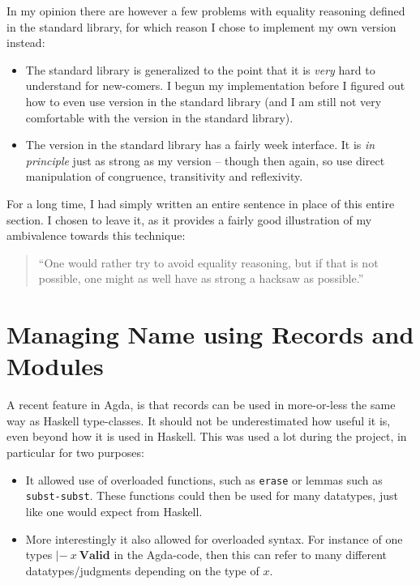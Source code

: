 In my opinion there are however a few problems with equality reasoning defined
in the standard library, for which reason I chose to implement my own version
instead:

\begin{itemize}
\item The standard library is generalized to the point that it is \emph{very}
  hard to understand for new-comers. I begun my implementation before I figured
  out how to even use version in the standard library (and I am still not very
  comfortable with the version in the standard library).
\item The version in the standard library has a fairly week interface. It is
  \emph{in principle} just as strong as my version -- though then again, so use
  direct manipulation of congruence, transitivity and reflexivity.
\end{itemize}

For a long time, I had simply written an entire sentence in place of this entire
section. I chosen to leave it, as it provides a fairly good illustration of my
ambivalence towards this technique:

\begin{quote}
``One would rather try to avoid equality reasoning, but if that is not possible,
one might as well have as strong a hacksaw as possible.''
\end{quote}

\section{Managing Name using Records and Modules}
A recent feature in Agda, is that records can be used in more-or-less the same
way as Haskell type-classes. It should not be underestimated how useful it is,
even beyond how it is used in Haskell. This was used a lot during the project,
in particular for two purposes:

\begin{itemize}
\item It allowed use of overloaded functions, such as \texttt{erase} or lemmas
  such as \texttt{subst-subst}. These functions could then be used for many
  datatypes, just like one would expect from Haskell.
\item More interestingly it also allowed for overloaded syntax. For instance of
  one types $|-\ x\ \mathbf{Valid}$ in the Agda-code, then this can refer to
  many different datatypes/judgments depending on the type of $x$.
\end{itemize}

